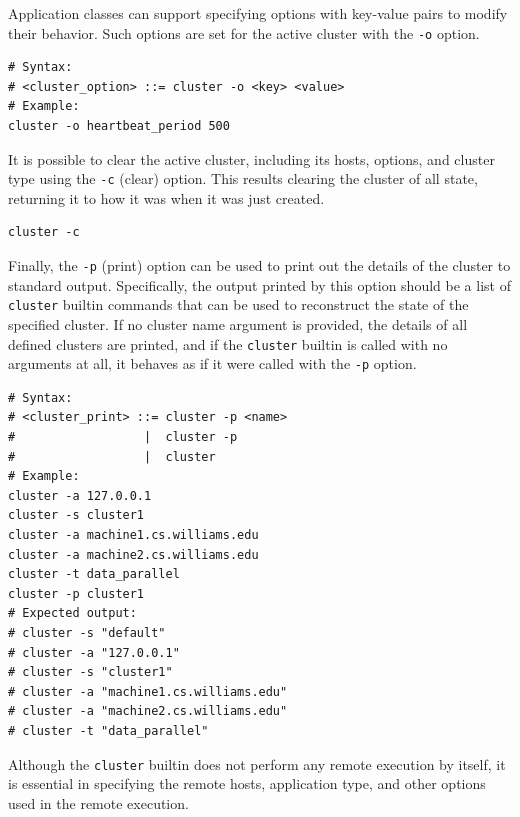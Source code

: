 \documentclass[oneside]{report}
\begin{document}
Application classes can support specifying options with key-value pairs to modify their behavior. Such options are set for the active cluster with the \texttt{-o} option.

\begin{minipage}[c]{\textwidth-15pt}
  \begin{lstlisting}[language=Shard]
# Syntax:
# <cluster_option> ::= cluster -o <key> <value>
# Example:
cluster -o heartbeat_period 500
\end{lstlisting}
  \smallskip
\end{minipage}

It is possible to clear the active cluster, including its hosts, options, and cluster type using the \texttt{-c} (clear) option.
This results clearing the cluster of all state, returning it to how it was when it was just created.

\begin{minipage}[c]{\textwidth-15pt}
  \begin{lstlisting}[language=Shard]
cluster -c
\end{lstlisting}
  \smallskip
\end{minipage}

Finally, the \texttt{-p} (print) option can be used to print out the details of the cluster to standard output.
Specifically, the output printed by this option should be a list of \texttt{cluster} builtin commands that can be used to reconstruct the state of the specified cluster.
If no cluster name argument is provided, the details of all defined clusters are printed, and if the \texttt{cluster} builtin is called with no arguments at all, it behaves as if it were called with the \texttt{-p} option.

\begin{minipage}[c]{\textwidth-15pt}
  \begin{lstlisting}[language=Shard]
# Syntax:
# <cluster_print> ::= cluster -p <name>
#                  |  cluster -p
#                  |  cluster
# Example:
cluster -a 127.0.0.1
cluster -s cluster1
cluster -a machine1.cs.williams.edu
cluster -a machine2.cs.williams.edu
cluster -t data_parallel
cluster -p cluster1
# Expected output:
# cluster -s "default"
# cluster -a "127.0.0.1"
# cluster -s "cluster1"
# cluster -a "machine1.cs.williams.edu"
# cluster -a "machine2.cs.williams.edu"
# cluster -t "data_parallel"
\end{lstlisting}
  \smallskip
\end{minipage}

Although the \texttt{cluster} builtin does not perform any remote execution by itself, it is essential in specifying the remote hosts, application type, and other options used in the remote execution.
\end{document}
